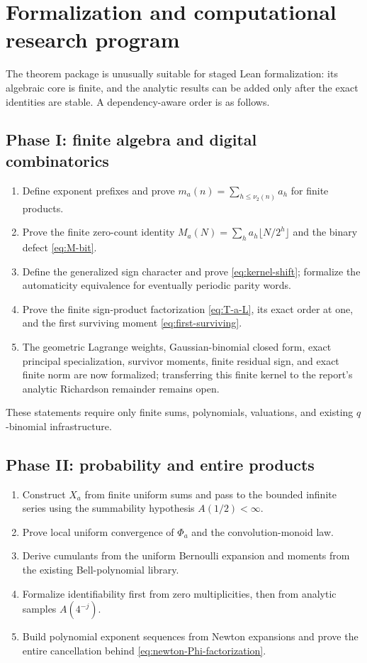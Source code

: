 \documentclass[11pt,oneside]{article}
\numberwithin{equation}{section}
\theoremstyle{definition}
\theoremstyle{remark}
\begin{document}
\section{Formalization and computational research program}
\label{sec:formalization}

The theorem package is unusually suitable for staged Lean formalization: its algebraic core
is finite, and the analytic results can be added only after the exact identities are stable.
A dependency-aware order is as follows.

\subsection{Phase I: finite algebra and digital combinatorics}

\begin{enumerate}
\item Define exponent prefixes and prove
      $m_a(n)=\sum_{h\le\nu_2(n)}a_h$ for finite products.
\item Prove the finite zero-count identity
      $M_a(N)=\sum_ha_h\lfloor N/2^h\rfloor$ and the binary defect
      \eqref{eq:M-bit}.
\item Define the generalized sign character and prove
      \eqref{eq:kernel-shift}; formalize the automaticity equivalence for eventually
      periodic parity words.
\item Prove the finite sign-product factorization \eqref{eq:T-a-L}, its exact order at one,
      and the first surviving moment \eqref{eq:first-surviving}.
\item The geometric Lagrange weights, Gaussian-binomial closed form, exact
      principal specialization, survivor moments, finite residual sign, and exact finite
      norm are now formalized; transferring this finite kernel to the report's analytic
      Richardson remainder remains open.
\end{enumerate}

These statements require only finite sums, polynomials, valuations, and existing
$q$-binomial infrastructure.

\subsection{Phase II: probability and entire products}

\begin{enumerate}
\item Construct $X_a$ from finite uniform sums and pass to the bounded infinite series using
      the summability hypothesis $A(1/2)<\infty$.
\item Prove local uniform convergence of $\Phi_a$ and the convolution-monoid law.
\item Derive cumulants from the uniform Bernoulli expansion and moments from the existing
      Bell-polynomial library.
\item Formalize identifiability first from zero multiplicities, then from analytic samples
      $A(4^{-j})$.
\item Build polynomial exponent sequences from Newton expansions and prove the entire
      cancellation behind \eqref{eq:newton-Phi-factorization}.
\end{enumerate}
\end{document}
